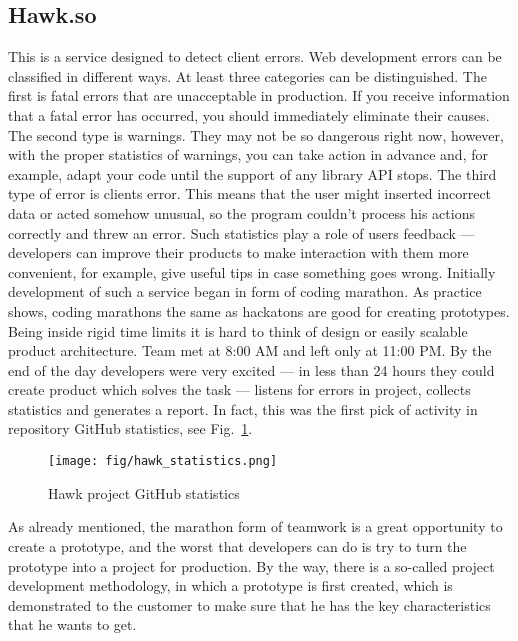 \documentclass[conference]{IEEEtran}
\begin{document}
    \subsection{Hawk.so}\label{subsec:hawk.so}
    This is a service designed to detect client errors.
    Web development errors can be classified in different ways.
    At least three categories can be distinguished.
    The first is fatal errors that are unacceptable in production.
    If you receive information that a fatal error has occurred, you should immediately eliminate their causes.
    The second type is warnings.
    They may not be so dangerous right now, however, with the proper statistics of warnings, you can take action in advance and, for example, adapt your code until the support of any library API stops.
    The third type of error is clients error.
    This means that the user might inserted incorrect data or acted somehow unusual, so the program couldn't process his actions correctly and threw an error.
    Such statistics play a role of users feedback — developers can improve their products to make interaction with them more convenient, for example, give useful tips in case something goes wrong.\newline
    Initially development of such a service began in form of coding marathon.
    As practice shows, coding marathons the same as hackatons are good for creating prototypes.
    Being inside rigid time limits it is hard to think of design or easily scalable product architecture.
    Team met at 8:00 AM and left only at 11:00 PM.
    By the end of the day developers were very excited — in less than 24 hours they could create product which solves the task — listens for errors in project, collects statistics and generates a report.
    In fact, this was the first pick of activity in repository GitHub statistics, see Fig.~\ref{fig:hawk}.
    \begin{figure}[h!]
        \centering
        \texttt{[image: fig/hawk\_statistics.png]}
        \caption{Hawk project GitHub statistics}
        \label{fig:hawk}
    \end{figure}
    \newline
    As already mentioned, the marathon form of teamwork is a great opportunity to create a prototype, and the worst that developers can do is try to turn the prototype into a project for production.
    By the way, there is a so-called project development methodology, in which a prototype is first created, which is demonstrated to the customer to make sure that he has the key characteristics that he wants to get.
\end{document}
